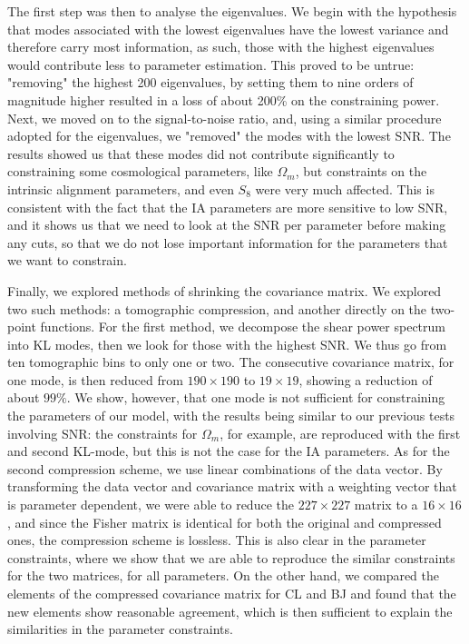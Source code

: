 \documentclass[twocolumn]{\docclass}
\begin{document}
	The first step was then to analyse the eigenvalues. We begin with the hypothesis that modes associated with the lowest eigenvalues have the lowest variance and therefore carry most information, as such, those with the highest eigenvalues would contribute less to parameter estimation. This proved to be untrue: "removing" the highest 200 eigenvalues, by setting them to nine orders of magnitude higher resulted in a loss of about 200\% on the constraining power. Next, we moved on to the signal-to-noise ratio, and, using a similar procedure adopted for the eigenvalues, we "removed" the modes with the lowest SNR. The results showed us that these modes did not contribute significantly to constraining some cosmological parameters, like $\Omega_m$, but constraints on the intrinsic alignment parameters, and even $S_8$ were very much affected. This is consistent with the fact that the IA parameters are more sensitive to low SNR, and it shows us that we need to look at the SNR per parameter before making any cuts, so that we do not lose important information for the parameters that we want to constrain.
	
	Finally, we explored methods of shrinking the covariance matrix. We explored two such methods: a tomographic compression, and another directly on the two-point functions. For the first method, we decompose the shear power spectrum into KL modes, then we look for those with the highest SNR. We thus go from ten tomographic bins to only one or two. The consecutive covariance matrix, for one mode, is then reduced from $190 \times 190$ to $19 \times 19$, showing a reduction of about $99\%$. We show, however, that one mode is not sufficient for constraining the parameters of our model, with the results being similar to our previous tests involving SNR: the constraints for $\Omega_m$, for example, are reproduced with the first and second KL-mode, but this is not the case for the IA parameters. As for the second compression scheme, we use linear combinations of the data vector. By transforming the data vector and covariance matrix with a weighting vector that is parameter dependent, we were able to reduce the $227 \times 227$ matrix to a $16 \times 16$, and since the Fisher matrix is identical for both the original and compressed ones, the compression scheme is lossless. This is also clear in the parameter constraints, where we show that we are able to reproduce the similar constraints for the two matrices, for all parameters. On the other hand, we compared the elements of the compressed covariance matrix for CL and BJ and found that the new elements show reasonable agreement, which is then sufficient to explain the similarities in the parameter constraints.
	
\end{document}
